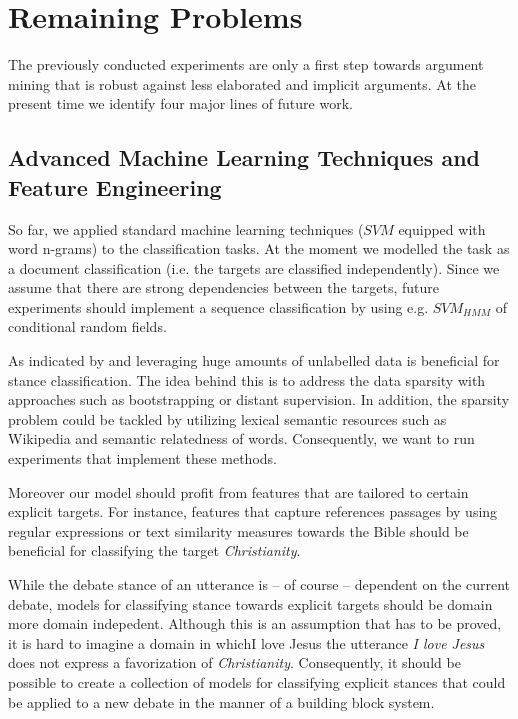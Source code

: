 \documentclass[11pt]{article}
\begin{document}
\section{Remaining Problems}
The previously conducted experiments are only a first step towards argument mining that is robust against less elaborated and implicit arguments.
At the present time we identify four major lines of future work.  

\subsection{Advanced Machine Learning Techniques and Feature Engineering}
So far, we applied standard machine learning techniques ($SVM$ equipped with word n-grams) to the classification tasks.
At the moment we modelled the task as a document classification (i.e. the targets are classified independently).
Since we assume that there are strong dependencies between the targets, future experiments should implement a sequence classification by using e.g. $SVM_{HMM}$ of conditional random fields. 

As indicated by  and  leveraging huge amounts of unlabelled data is beneficial for stance classification.
The idea behind this is to address the data sparsity with approaches such as bootstrapping or distant supervision.
In addition, the sparsity problem could be tackled by utilizing lexical semantic resources such as Wikipedia and semantic relatedness of words.
Consequently, we want to run experiments that implement these methods.

Moreover our model should profit from features that are tailored to certain explicit targets.
For instance, features that capture references passages by using regular expressions or text similarity measures towards the Bible should be beneficial for classifying the target \textit{Christianity}.

While the debate stance of an utterance is -- of course -- dependent on the current debate, models for classifying stance towards explicit targets should be domain more domain indepedent. 
Although this is an assumption that has to be proved, it is hard to imagine a domain in whichI love Jesus the utterance \textit{I love Jesus} does not express a favorization of \textit{Christianity}.
Consequently, it should be possible to create a collection of models for classifying explicit stances that could be applied to a new debate in the manner of a building block system.
\end{document}
